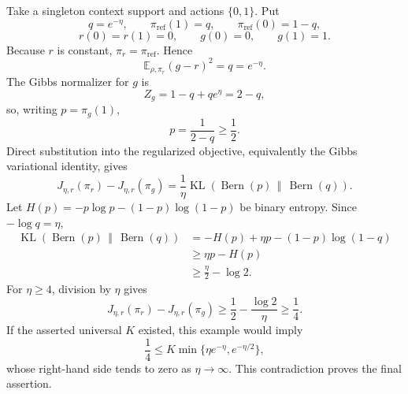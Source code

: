 Take a singleton context support and actions \(\{0,1\}\). Put
\[
q=e^{-\eta},\qquad
\pi_{\mathrm{ref}}(1)=q,\qquad
\pi_{\mathrm{ref}}(0)=1-q,
\]
\[
r(0)=r(1)=0,\qquad g(0)=0,\qquad g(1)=1.
\]
Because \(r\) is constant, \(\pi_r=\pi_{\mathrm{ref}}\). Hence
\[
\mathbb E_{\rho,\pi_r}(g-r)^2=q=e^{-\eta}.
\]
The Gibbs normalizer for \(g\) is
\[
Z_g=1-q+qe^\eta=2-q,
\]
so, writing \(p=\pi_g(1)\),
\[
p=\frac1{2-q}\ge\frac12.
\]
Direct substitution into the regularized objective, equivalently the Gibbs variational identity, gives
\[
J_{\eta,r}(\pi_r)-J_{\eta,r}(\pi_g)
=\frac1\eta\operatorname{KL}\!\left(\operatorname{Bern}(p)\,\middle\Vert\,\operatorname{Bern}(q)\right).
\]
Let \(H(p)=-p\log p-(1-p)\log(1-p)\) be binary entropy. Since \(-\log q=\eta\),
\[
\begin{aligned}
\operatorname{KL}\!\left(\operatorname{Bern}(p)\,\middle\Vert\,\operatorname{Bern}(q)\right)
&=-H(p)+\eta p-(1-p)\log(1-q)\\
&\ge \eta p-H(p)\\
&\ge \frac\eta2-\log2.
\end{aligned}
\]
For \(\eta\ge4\), division by \(\eta\) gives
\[
J_{\eta,r}(\pi_r)-J_{\eta,r}(\pi_g)
\ge\frac12-\frac{\log2}{\eta}\ge\frac14.
\]
If the asserted universal \(K\) existed, this example would imply
\[
\frac14\le K\min\{\eta e^{-\eta},e^{-\eta/2}\},
\]
whose right-hand side tends to zero as \(\eta\to\infty\). This contradiction proves the final assertion.